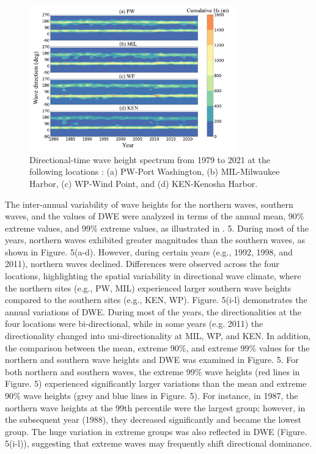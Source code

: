 \begin{figure}[htbp]
  \centering
  \includegraphics[width=0.8\textwidth]{chapter3/resources/figure3-4.jpg}
  \caption{Directional-time wave height spectrum from 1979 to 2021 at the following locations : (a) PW-Port Washington, (b) MIL-Milwaukee Harbor, (c) WP-Wind Point, and (d) KEN-Kenosha Harbor.}
  \label{fig:fig3.4}
\end{figure}

The inter-annual variability of wave heights for the northern waves, southern waves, and the values of DWE were analyzed in terms of the annual mean, 90\% extreme values, and 99\% extreme values, as illustrated in . 5. During most of the years, northern waves exhibited greater magnitudes than the southern waves, as shown in Figure. 5(a-d). However, during certain years (e.g., 1992, 1998, and 2011), northern waves declined. Differences were observed across the four locations, highlighting the spatial variability in directional wave climate, where the northern sites (e.g., PW, MIL) experienced larger southern wave heights compared to the southern sites (e.g., KEN, WP). Figure. 5(i-l) demonstrates the annual variations of DWE. During most of the years, the directionalities at the four locations were bi-directional, while in some years (e.g. 2011) the directionality changed into uni-directionality at MIL, WP, and KEN. In addition, the comparison between the mean, extreme 90\%, and extreme 99\% values for the northern and southern wave heights and DWE was examined in Figure. 5. For both northern and southern waves, the extreme 99\% wave heights (red lines in Figure. 5) experienced significantly larger variations than the mean and extreme 90\% wave heights (grey and blue lines in Figure. 5). For instance, in 1987, the northern wave heights at the 99th percentile were the largest group; however, in the subsequent year (1988), they decreased significantly and became the lowest group. The huge variation in extreme groups was also reflected in DWE (Figure. 5(i-l)), suggesting that extreme waves may frequently shift directional dominance.

